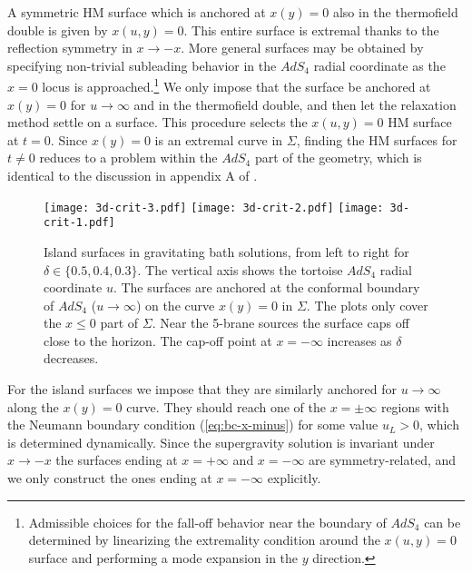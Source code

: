 \documentclass[aps,prd,11pt,notitlepage,longbibliography,nofootinbib,tightenlines,preprintnumbers]{revtex4-1}
\begin{document}
A symmetric HM surface which is anchored at $x(y)=0$ also in the thermofield double is given by $x(u,y)=0$. This entire surface is extremal thanks to the reflection symmetry in $x\rightarrow -x$.
More general surfaces may be obtained by specifying non-trivial subleading behavior in the $AdS_4$ radial coordinate as the $x=0$ locus is approached.\footnote{Admissible choices for the fall-off behavior near the boundary of $AdS_4$ can be determined by linearizing the extremality condition around the $x(u,y)=0$ surface and performing a mode expansion in the $y$ direction.}
%
We only impose that the surface be anchored at $x(y)=0$ for $u\rightarrow\infty$ and in the thermofield double, and then let the relaxation method settle on a surface. 
This procedure selects the $x(u,y)=0$ HM surface at $t=0$.
Since $x(y)=0$ is an extremal curve in $\Sigma$, finding the HM surfaces for $t\neq 0$ reduces to a problem within the $AdS_4$ part of the geometry, which is identical to the discussion in appendix A of \cite{Geng:2020fxl}.

\begin{figure}
	\texttt{[image: 3d-crit-3.pdf]}
	\hskip 5mm
	\texttt{[image: 3d-crit-2.pdf]}
	\hskip 5mm
	\texttt{[image: 3d-crit-1.pdf]}		
	\caption{Island surfaces in gravitating bath solutions, from left to right for $\delta\in\lbrace 0.5,0.4,0.3\rbrace$.
		The vertical axis shows the tortoise $AdS_4$ radial coordinate $u$. The surfaces are anchored at the conformal boundary of $AdS_4$ ($u\rightarrow\infty$) on the curve $x(y)=0$ in $\Sigma$.
		The plots only cover the $x\leq 0$ part of $\Sigma$. Near the 5-brane sources the surface caps off close to the horizon.  The cap-off point at $x=-\infty$ increases as $\delta$ decreases.
		\label{fig:LRcrit2}}
\end{figure}


For the island surfaces we impose that they are similarly anchored for $u\rightarrow\infty$ along the $x(y)=0$ curve.
They should reach one of the $x=\pm\infty$ regions with the Neumann boundary condition (\ref{eq:bc-x-minus}) for some value $u_L>0$, which is determined dynamically. Since the supergravity solution is invariant under $x\rightarrow -x$ the surfaces ending at $x=+\infty$ and $x=-\infty$ are symmetry-related, and we only construct the ones ending at $x=-\infty$ explicitly.
\end{document}
